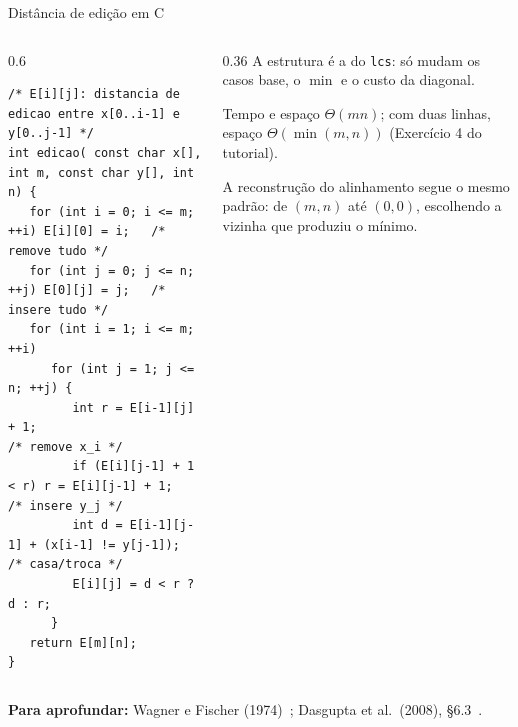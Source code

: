 \documentclass[aspectratio=169,xcolor=table]{beamer}
\newcommand{\fonte}[1]{%
  \vfill
  {\tiny\color{gray!55!black}\textbf{Para aprofundar:} #1\par}%
}
\begin{document}
\begin{frame}[fragile]{Distância de edição em C}
  \begin{columns}[T]
    \begin{column}{0.6\textwidth}
\begin{lstlisting}[basicstyle=\ttfamily\tiny]
/* E[i][j]: distancia de edicao entre x[0..i-1] e y[0..j-1] */
int edicao( const char x[], int m, const char y[], int n) {
   for (int i = 0; i <= m; ++i) E[i][0] = i;   /* remove tudo */
   for (int j = 0; j <= n; ++j) E[0][j] = j;   /* insere tudo */
   for (int i = 1; i <= m; ++i)
      for (int j = 1; j <= n; ++j) {
         int r = E[i-1][j] + 1;                         /* remove x_i */
         if (E[i][j-1] + 1 < r) r = E[i][j-1] + 1;      /* insere y_j */
         int d = E[i-1][j-1] + (x[i-1] != y[j-1]);      /* casa/troca */
         E[i][j] = d < r ? d : r;
      }
   return E[m][n];
}
\end{lstlisting}
    \end{column}
    \begin{column}{0.36\textwidth}
      \scriptsize A estrutura é a do \texttt{lcs}: só mudam os casos base, o $\min$ e o
      custo da diagonal.
      \medskip

      Tempo e espaço $\Theta(mn)$; com duas linhas, espaço $\Theta(\min(m,n))$
      (Exercício 4 do tutorial).
      \medskip

      A reconstrução do alinhamento segue o mesmo padrão: de $(m,n)$ até $(0,0)$,
      escolhendo a vizinha que produziu o mínimo.
    \end{column}
  \end{columns}
  \fonte{Wagner e Fischer (1974)~\cite{wagner1974string};
    Dasgupta et al.\ (2008), \S 6.3~\cite{dasgupta2008algorithms}.}
\end{frame}
\end{document}
